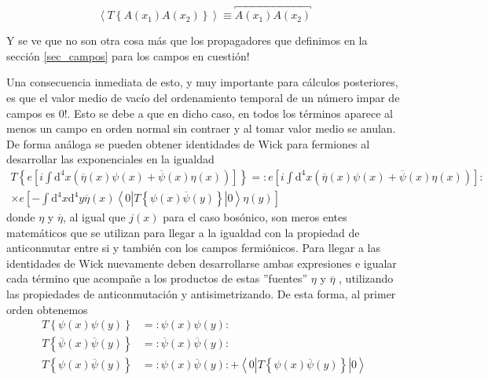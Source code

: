 \documentclass[tickz]{article}
\numberwithin{equation}{section}
\begin{document}
\begin{equation}\label{key}
\left\langle T\left\{ A(x_{1})A(x_{2})\right\} \right\rangle \equiv \overbracket{A(x_{1})A(x_{2})}
\end{equation}

Y se ve que no son otra cosa más que los propagadores que definimos en la sección \ref{sec_campos} para los campos en cuestión!

Una consecuencia inmediata de esto, y muy importante para cálculos posteriores, es que el valor
medio de vacío del ordenamiento temporal de un número impar de campos
es 0!. Esto se debe a que en dicho caso, en todos los términos aparece
al menos un campo en orden normal sin contraer y al tomar valor medio
se anulan.\\

De forma análoga se pueden obtener identidades de Wick
para fermiones al desarrollar las exponenciales en la igualdad
\begin{equation}\label{wickfer}
\begin{aligned}
T\left\{ e\left[i\int \mathrm{d^4}x\left(\overline{\eta}(x)\psi(x)+\overline{\psi}(x)\eta(x)\right)\right]\right\} =:e\left[i\int \mathrm{d^4}x\left(\overline{\eta}(x)\psi(x)+\overline{\psi}(x)\eta(x)\right)\right]:\\
\times e\left[-\int \mathrm{d^4}x\mathrm{d^4}y\overline{\eta}(x)\left\langle 0|T\left\{ \psi(x)\overline{\psi}(y)\right\} |0\right\rangle \eta(y)\right]
\end{aligned}
\end{equation}
donde $\eta$ y $\overline{\eta}$, al igual que $ j(x) $ para el caso bosónico, son meros entes matemáticos que
se utilizan para llegar a la igualdad con la propiedad de anticonmutar
entre si y también con los campos fermiónicos. Para llegar a las identidades
de Wick nuevamente deben desarrollarse ambas expresiones e igualar
cada término que acompañe a los productos de estas ''fuentes'' $\eta$
y $\overline{\eta}$ , utilizando las propiedades de anticonmutación
y antisimetrizando. De esta forma, al primer orden obtenemos
\begin{align}
T\left\{ \psi(x)\psi(y)\right\}  & =:\psi(x)\psi(y):\\
T\left\{ \overline{\psi}(x)\overline{\psi}(y)\right\}  & =:\overline{\psi}(x)\overline{\psi}(y):\\
T\left\{ \psi(x)\overline{\psi}(y)\right\}  & =:\psi(x)\overline{\psi}(y):+\left\langle 0|T\left\{ \psi(x)\overline{\psi}(y)\right\} |0\right\rangle 
\end{align}
\end{document}
